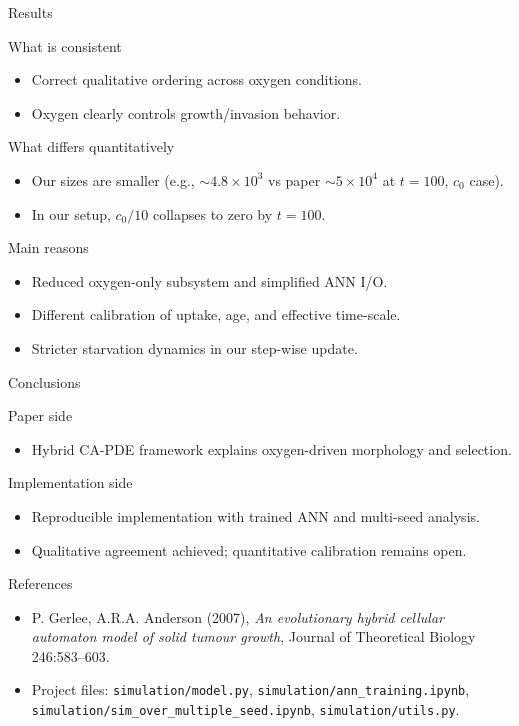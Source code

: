 \documentclass[10pt,aspectratio=169]{beamer}
\begin{document}
\begin{frame}[c]{Results}
\small
\begin{block}{What is consistent}
\begin{itemize}
  \item Correct qualitative ordering across oxygen conditions.
  \item Oxygen clearly controls growth/invasion behavior.
\end{itemize}
\end{block}
\begin{alertblock}{What differs quantitatively}
\begin{itemize}
  \item Our sizes are smaller (e.g., $\sim 4.8\times10^3$ vs paper $\sim 5\times10^4$ at $t=100$, $c_0$ case).
  \item In our setup, $c_0/10$ collapses to zero by $t=100$.
\end{itemize}
\end{alertblock}
\begin{block}{Main reasons}
\begin{itemize}
  \item Reduced oxygen-only subsystem and simplified ANN I/O.
  \item Different calibration of uptake, age, and effective time-scale.
  \item Stricter starvation dynamics in our step-wise update.
\end{itemize}
\end{block}
\end{frame}

\begin{frame}[c]{Conclusions}
\begin{block}{Paper side}
\begin{itemize}
  \item Hybrid CA-PDE framework explains oxygen-driven morphology and selection.
\end{itemize}
\end{block}
\begin{block}{Implementation side}
\begin{itemize}
  \item Reproducible implementation with trained ANN and multi-seed analysis.
  \item Qualitative agreement achieved; quantitative calibration remains open.
\end{itemize}
\end{block}
\end{frame}

\begin{frame}[c]{References}
\small
\begin{itemize}
  \item P. Gerlee, A.R.A. Anderson (2007), \emph{An evolutionary hybrid cellular automaton model of solid tumour growth}, Journal of Theoretical Biology 246:583--603.
  \item Project files: \texttt{simulation/model.py}, \texttt{simulation/ann\_training.ipynb}, \texttt{simulation/sim\_over\_multiple\_seed.ipynb}, \texttt{simulation/utils.py}.
\end{itemize}
\end{frame}
\end{document}
